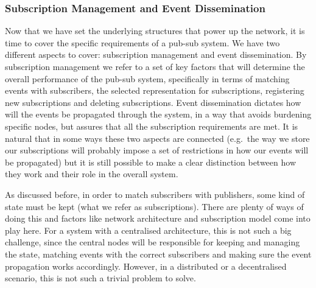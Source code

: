 \subsubsection{Subscription Management and Event
Dissemination}\label{subscription-management-and-event-dissemination}

Now that we have set the underlying structures that power up the
network, it is time to cover the specific requirements of a pub-sub
system. We have two different aspects to cover: subscription management
and event dissemination. By subscription management we refer to a set of
key factors that will determine the overall performance of the pub-sub
system, specifically in terms of matching events with subscribers, the
selected representation for subscriptions, registering new subscriptions
and deleting subscriptions. Event dissemination dictates how will the
events be propagated through the system, in a way that avoids burdening
specific nodes, but assures that all the subscription requirements are
met. It is natural that in some ways these two aspects are connected
(e.g.~the way we store our subscriptions will probably impose a set of
restrictions in how our events will be propagated) but it is still
possible to make a clear distinction between how they work and their
role in the overall system.

As discussed before, in order to match subscribers with publishers, some
kind of state must be kept (what we refer as subscriptions). There are
plenty of ways of doing this and factors like network architecture and
subscription model come into play here. For a system with a centralised
architecture, this is not such a big challenge, since the central nodes
will be responsible for keeping and managing the state, matching events
with the correct subscribers and making sure the event propagation works
accordingly. However, in a distributed or a decentralised scenario, this
is not such a trivial problem to solve.

